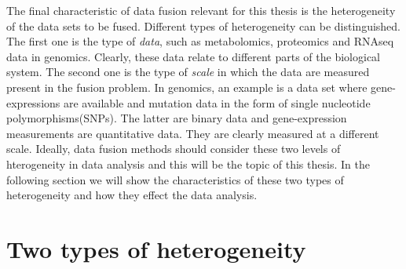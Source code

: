 The final characteristic of data fusion relevant for this thesis is the heterogeneity of the data sets to be fused. Different types of heterogeneity can be distinguished. The first one is the type of \emph{data}, such as metabolomics, proteomics and RNAseq data in genomics. Clearly, these data relate to different parts of the biological system. The second one is the type of \emph{scale} in which the data are measured present in the fusion problem. In genomics, an example is a data set where gene-expressions are available and mutation data in the form of single nucleotide polymorphisms(SNPs). The latter are binary data and gene-expression measurements are quantitative data. They are clearly measured at a different scale. Ideally, data fusion methods should consider these two levels of hterogeneity in data analysis and this will be the topic of this thesis. In the following section we will show the characteristics of these two types of heterogeneity and how they effect the data analysis.

\section{Two types of heterogeneity}

